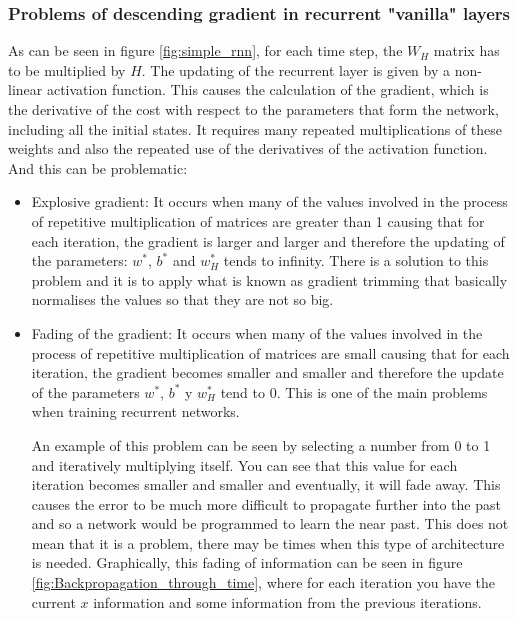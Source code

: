 \subsubsection{Problems of descending gradient in recurrent "vanilla" layers}
As can be seen in figure \ref{fig:simple_rnn}, for each time step, the $W_H$ matrix has to be multiplied by $H$. The updating of the recurrent layer is given by a non-linear activation function. This causes the calculation of the gradient, which is the derivative of the cost with respect to the parameters that form the network, including all the initial states. It requires many repeated multiplications of these weights and also the repeated use of the derivatives of the activation function. And this can be problematic:


\begin{itemize}
    \item Explosive gradient: It occurs when many of the values involved in the process of repetitive multiplication of matrices are greater than 1 causing that for each iteration, the gradient is larger and larger and therefore the updating of the parameters:  $w^*$, $b^*$ and $w_H^*$ tends to infinity. There is a solution to this problem and it is to apply what is known as gradient trimming that basically normalises the values so that they are not so big.
    \item Fading of the gradient: It occurs when many of the values involved in the process of repetitive multiplication of matrices are small causing that for each iteration, the gradient becomes smaller and smaller and therefore the update of the parameters $w^*$, $b^*$ y $w_H^*$ tend to $0$. This is one of the main problems when training recurrent networks.
    \newline
    
    
    An example of this problem can be seen by selecting a number from 0 to 1 and iteratively multiplying itself. You can see that this value for each iteration becomes smaller and smaller and eventually, it will fade away. This causes the error to be much more difficult to propagate further into the past and so a network would be programmed to learn the near past. This does not mean that it is a problem, there may be times when this type of architecture is needed. Graphically, this fading of information can be seen in figure \ref{fig:Backpropagation_through_time}, where for each iteration you have the current $x$ information and some information from the previous iterations.
    

\end{itemize}
